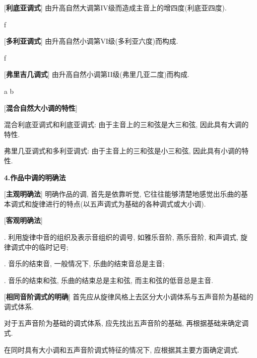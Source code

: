 [\textbf{利底亚调式}] 由升高自然大调第IV级而造成主音上的增四度(利底亚四度). \par
\startextract
\Notes {} \sh f \en
\zendextract

[\textbf{多利亚调式}] 由升高自然小调第VI级(多利亚六度)而构成.\par
\startextract
\Notes {} \sh f \en
\zendextract

[\textbf{弗里吉几调式}] 由升高自然小调第II级(弗里几亚二度)而构成.\par
\startextract
\Notes \wh a \fl b \en
\zendextract

[\textbf{混合自然大小调的特性}]\par
\qquad 混合利底亚调式和利底亚调式: 由于主音上的三和弦是大三和弦, 因此具有大调的特性.\par
\qquad 弗里几亚调式和多利亚调式: 由于主音上的三和弦是小三和弦, 因此具有小调的特性.\par

\begin{center}
 \textbf{4.作品中调的明确法}\\
\end{center}

[\textbf{主观明确法}] 明确作品的调, 首先是依靠听觉, 它往往能够清楚地感觉出乐曲的基本调式和旋律进行的特点(以五声调式为基础的各种调式或大小调). \par

[\textbf{客观明确法}] \par
{}. 利用旋律中音的组织及表示音组织的调号, 如雅乐音阶, 燕乐音阶, 和声调式, 旋律调式中的临时记号;\par
{}. 音乐的结束音, 一般情况下, 乐曲的结束音总是主音;\par
{}. 音乐的结束和弦, 乐曲的结束总是主和弦, 而主和弦的低音总是主音.\par

[\textbf{相同音阶调式的明确}] 首先应从旋律风格上去区分大小调体系与五声音阶为基础的调式体系.\par
\qquad 对于五声音阶为基础的调式体系, 应先找出五声音阶的基础, 再根据基础来确定调式.\par
\qquad 在同时具有大小调和五声音阶调式特征的情况下, 应根据其主要方面确定调式.\par


